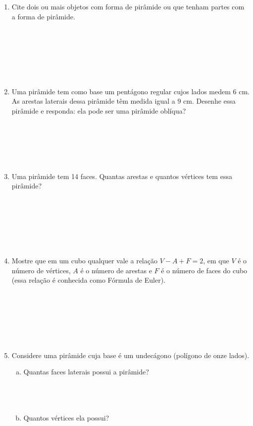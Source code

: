 \documentclass[a4paper,14pt]{article}
\begin{document}
\begin{multicols}{2}
\begin{enumerate}
		    \item Cite dois ou mais objetos com forma de pirâmide ou que tenham partes com a forma de pirâmide. \\\\\\\\\\\\\\
		    \item Uma pirâmide tem como base um pentágono regular cujos lados medem 6 cm. As arestas laterais dessa pirâmide têm medida igual a 9 cm. Desenhe essa pirâmide e responda: ela pode ser uma pirâmide oblíqua? \\\\\\\\\\\\
		    \item Uma pirâmide tem 14 faces. Quantas arestas e quantos vértices tem essa pirâmide? \\\\\\\\\\\\\\
		    \item Mostre que em um cubo qualquer vale a relação $V - A + F = 2$, em que $V$ é o número de vértices, $A$ é o número de arestas e $F$ é o número de faces do cubo (essa relação é conhecida como Fórmula de Euler). \\\\\\\\\\\\\\
		    \item Considere uma pirâmide cuja base é um undecágono (polígono de onze lados).
		    \begin{enumerate}[a)]
		    	\item Quantas faces laterais possui a pirâmide? \\\\\\\\
		    	\item Quantos vértices ela possui? \\\\\\\\\\

\end{enumerate}
\end{enumerate}
\end{multicols}
\end{document}
